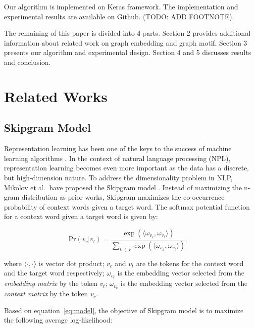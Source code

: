 \documentclass[letterpaper]{article}
\begin{document}
        Our algorithm is implemented on Keras \cite{keras} framework. The implementation and experimental
        results are available on Github. (TODO: ADD FOOTNOTE).

        The remaining of this paper is divided into 4 parts. Section 2 provides additional information
        about related work on graph embedding and graph motif. Section 3 presents our algorithm and
        experimental design. Section 4 and 5 discusses results and conclusion.

    \section{Related Works}
        \subsection{Skipgram Model}
            Representation learning has been one of the keys to the success of machine learning 
            algorithms \cite{bengiorepreview}. In the context of natural language processing (NPL),
            representation learning becomes even more important as the data has a discrete, but
            high-dimension nature. To address the dimensionality problem in NLP, Mikolov et al.\ have
            proposed the Skipgram model \cite{skipgram}. Instead of maximizing the n-gram distribution
            as prior works, Skipgram maximizes the co-occurrence probability of context words given a
            target word. The softmax potential function for a context word given a target 
            word is given by:

            \begin{equation}
                \label{eq:model}
                \mbox{Pr} (v_c | v_t) = \frac{\exp{( \langle \omega_{v_c} ,  \omega_{v_t} \rangle )}}{\sum_{k \in V} \exp{( \langle \omega_{v_k} ,  \omega_{v_t} \rangle )}},
            \end{equation}
            
            \noindent
            where $ \langle \cdot ,  \cdot \rangle $ is vector dot product; $ v_c $ and $ v_t $ are the
            tokens for the context word and the target word respectively; $\omega_{v_t}$ is the embedding
            vector selected from the \emph{embedding matrix} by the token $v_t$; $\omega_{v_c}$ is the
            embedding vector selected from the \emph{context matrix} by the token $v_c$.

            Based on equation~\ref{eq:model}, the objective of Skipgram model is to maximize the following
            average log-likelihood:
\end{document}
